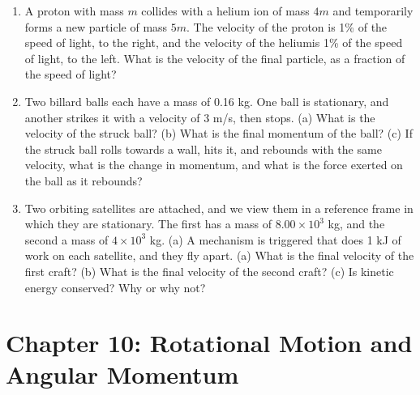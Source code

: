 \documentclass[10pt]{article}
\begin{document}
\begin{enumerate}
\item A proton with mass $m$ collides with a helium ion of mass $4m$ and temporarily forms a new particle of mass $5m$.  The velocity of the proton is 1\% of the speed of light, to the right, and the velocity of the heliumis 1\% of the speed of light, to the left.  What is the velocity of the final particle, as a fraction of the speed of light? \\ \vspace{2cm}
\item Two billard balls each have a mass of 0.16 kg.  One ball is stationary, and another strikes it with a velocity of 3 m/s, then stops.  (a) What is the velocity of the struck ball?  (b) What is the final momentum of the ball?  (c) If the struck ball rolls towards a wall, hits it, and rebounds with the same velocity, what is the change in momentum, and what is the force exerted on the ball as it rebounds?  \\ \vspace{3cm}
\item Two orbiting satellites are attached, and we view them in a reference frame in which they are stationary. The first has a mass of $8.00 \times 10^3$ kg, and the second a mass of $4 \times 10^3$ kg. (a) A mechanism is triggered that does 1 kJ of work on each satellite, and they fly apart. (a) What is the final velocity of the first craft?  (b) What is the final velocity of the second craft? (c) Is kinetic energy conserved?  Why or why not? \\ \vspace{3cm}
\end{enumerate}

\section{Chapter 10: Rotational Motion and Angular Momentum}
\end{document}
